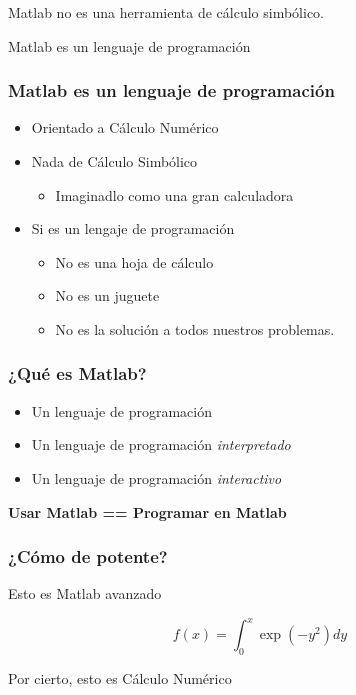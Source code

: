 \documentclass[12pt]{beamer}
\begin{document}
\begin{frame}
  \begin{Huge}
    \begin{center}
      Matlab no es una herramienta de cálculo simbólico.
    \end{center}
  \end{Huge}
  \pause
  Matlab es un lenguaje de programación
\end{frame}

\begin{frame}
  \frametitle{Matlab es un lenguaje de programación}
  \begin{itemize}
  \item Orientado a Cálculo Numérico
  \item Nada de Cálculo Simbólico
    \begin{itemize}
    \item Imaginadlo como una gran calculadora
    \end{itemize}
  \item Si es un lengaje de programación
    \begin{itemize}
    \item No es una hoja de cálculo
    \item No es un juguete
    \item No es la solución a todos nuestros problemas.
    \end{itemize}
  \end{itemize}
\end{frame}

\begin{frame}
  \frametitle{¿Qué es Matlab?}
  \begin{itemize}
    \item{Un lenguaje de programación}
    \item{Un lenguaje de programación \emph{interpretado}}
    \item{Un lenguaje de programación \emph{interactivo}}
  \end{itemize}
  \begin{center}
    \textbf{Usar Matlab == Programar en Matlab}
  \end{center}
\end{frame}


\begin{frame}
  \frametitle{¿Cómo de potente?}
Esto es Matlab avanzado

\[ f(x) = \int_0^x \exp(-y^2) dy \]

\testcode

Por cierto, esto es Cálculo Numérico
\end{frame}
\end{document}
